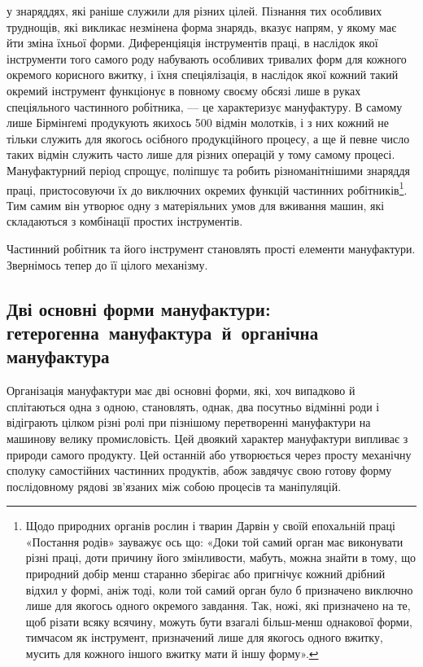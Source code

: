 \parcont{}  %
у знаряддях, які раніше служили для різних цілей. Пізнання
тих особливих труднощів, які викликає незмінена форма знарядь,
вказує напрям, у якому має йти зміна їхньої форми. Диференціяція
інструментів праці, в наслідок якої інструменти того самого роду
набувають особливих тривалих форм для кожного окремого
корисного вжитку, і їхня спеціялізація, в наслідок якої кожний
такий окремий інструмент функціонує в повному своєму обсязі
лише в руках спеціяльного частинного робітника, — це характеризує мануфактуру.
В самому лише Бірмінґемі продукують
якихось 500 відмін молотків, і з них кожний не тільки служить
для якогось осібного продукційного процесу, а ще й певне число
таких відмін служить часто лише для різних операцій у тому
самому процесі. Мануфактурний період спрощує, поліпшує та
робить різноманітнішими знаряддя праці, пристосовуючи їх до
виключних окремих функцій частинних робітників\footnote{
Щодо природних органів рослин і тварин Дарвін у своїй епохальній праці
«Постання родів» зауважує ось що: «Доки той самий орган має виконувати різні
праці, доти причину його змінливости, мабуть, можна знайти в тому, що природний
добір менш старанно зберігає або пригнічує кожний дрібний відхил у
формі, аніж тоді, коли той самий орган було б призначено виключно лише для
якогось одного окремого завдання. Так, ножі, які призначено на те, щоб різати
всяку всячину, можуть бути взагалі більш-менш однакової форми, тимчасом як
інструмент, призначений лише для якогось одного вжитку, мусить для кожного
іншого вжитку мати й іншу форму».
}. Тим самим він утворює одну з матеріяльних умов для вживання машин,
які складаються з комбінації простих інструментів.

Частинний робітник та його інструмент становлять прості
елементи мануфактури. Звернімось тепер до її цілого механізму.

\subsection[%
Дві основні форми мануфактури: гетерогенна мануфактура
й~органічна мануфактура
]{Дві основні форми мануфактури: гетерогенна~мануфактура~й~органічна мануфактура}

Організація мануфактури має дві основні форми, які, хоч
випадково й сплітаються одна з одною, становлять, однак, два
посутньо відмінні роди і відіграють цілком різні ролі при пізнішому перетворенні
мануфактури на машинову велику промисловість. Цей двоякий характер мануфактури
випливає з природи самого продукту. Цей останній або утворюється через просту
механічну сполуку самостійних частинних продуктів, абож
завдячує свою готову форму послідовному рядові зв’язаних між
собою процесів та маніпуляцій.

